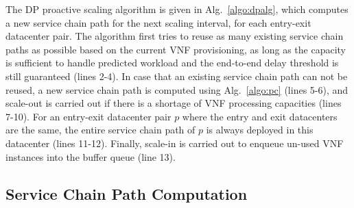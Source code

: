 The DP proactive scaling algorithm is given in Alg.~\ref{algo:dpalg}, which computes a new service chain path for the next scaling interval, for each entry-exit datacenter pair. %
The algorithm first tries to reuse as many existing service chain paths as possible based on the current VNF provisioning, as long as the capacity is sufficient to handle predicted workload and the end-to-end delay threshold is still guaranteed (lines 2-4). In case that an existing service chain path can not be reused, a new service chain path is computed using Alg.~\ref{algo:pc} (lines 5-6), and scale-out is carried out if there is a shortage of VNF processing capacities (lines 7-10). For an entry-exit datacenter pair $p$ where the entry and exit datacenters are the same, the entire service chain path of $p$ is always deployed in this datacenter (lines 11-12). %
Finally, scale-in is carried out to enqueue un-used VNF instances into the buffer queue (line 13).





\vspace{-3mm}
\subsection{Service Chain Path Computation}
\label{sec:pathcomp}


